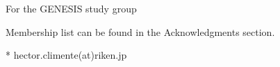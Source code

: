 \documentclass[10pt,letterpaper]{article}
\begin{document}
\begin{flushleft}

\textcurrency For the GENESIS study group %


\textpilcrow Membership list can be found in the Acknowledgments section.

* hector.climente(at)riken.jp

\end{flushleft}
\end{document}
